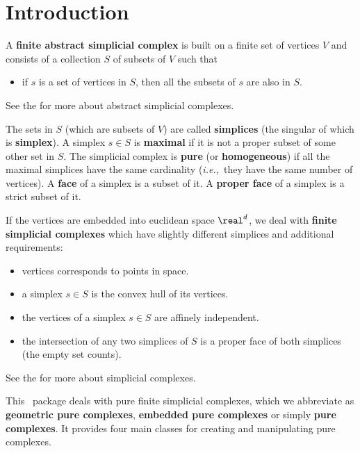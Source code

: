 {
\newcommand{\ie}{\emph{i.e.,}}

\section{Introduction\label{pure_complex:intro}}

A \textbf{finite abstract simplicial complex} is built on a finite set of
vertices $V$ and consists of a collection $S$ of subsets of $V$ such that
\begin{itemize}
\item if $s$ is a set of vertices in $S$, then all the subsets of $s$ are also
in $S$.
\end{itemize}
See the
 for more about abstract simplicial complexes.

The sets in $S$ (which are subsets of $V$) are called \textbf{simplices} (the
singular of which is \textbf{simplex}).
%
A simplex $s\in S$ is \textbf{maximal} if it is not a proper subset of some other
set in $S$. The simplicial complex is \textbf{pure} (or \textbf{homogeneous})
if all the maximal simplices have the same cardinality (\ie\ they have the same
number of vertices). A \textbf{face} of a simplex is a subset of it. A
\textbf{proper face} of a simplex is a strict subset of it.

If the vertices are embedded into euclidean space $\real^d$, we deal with
\textbf{finite simplicial complexes} which have slightly different simplices
and additional requirements:
\begin{itemize}
\item vertices corresponds to points in space.
\item a simplex $s\in S$ is the convex hull of its vertices.
\item the vertices of a simplex $s\in S$ are affinely independent.
\item the intersection of any two simplices of $S$ is a proper face of both
simplices (the empty set counts).
\end{itemize}
See the  for more about simplicial complexes.

This \cgal\ package deals with pure finite simplicial complexes, which we
abbreviate as \textbf{geometric pure complexes}, \textbf{embedded pure
complexes} or simply \textbf{pure complexes}. It provides four main classes
for creating and manipulating pure complexes.

}
